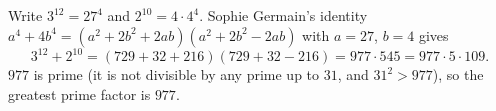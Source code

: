 Write $3^{12}=27^4$ and $2^{10}=4\cdot 4^4$. Sophie Germain's identity $a^4+4b^4=(a^2+2b^2+2ab)(a^2+2b^2-2ab)$ with $a=27$, $b=4$ gives
\[3^{12}+2^{10}=(729+32+216)(729+32-216)=977\cdot545=977\cdot5\cdot109.\]
$977$ is prime (it is not divisible by any prime up to $31$, and $31^2>977$), so the greatest prime factor is $\boxed{977}$.
